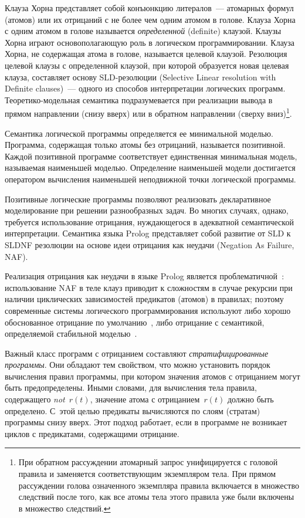 \begin{multicols}{2}
Клауза Хорна представляет собой конъюнкцию литералов~--- атомарных формул (атомов) 
или их отрицаний с не более чем одним атомом в голове. Клауза Хорна с одним атомом в 
голове называется \textit{определенной} (definite) клаузой. Клаузы Хорна играют 
основополагающую роль в логическом программировании. Клауза Хорна, не содержащая 
атома в голове, называется целевой клаузой. Резолюция целевой клаузы с определенной 
клаузой, при которой образуется новая целевая клауза, составляет основу SLD-резолюции 
(Selective Linear resolution with Definite clauses)~--- одного из способов интерпретации 
логических программ. Теоретико-модельная семантика подразумевается при реализации 
вывода в прямом направлении (снизу вверх) или в обратном направлении (сверху 
вниз)\footnote{При обратном рассуждении атомарный запрос унифицируется с головой 
правила и заменяется соответствующим экземпляром тела. При прямом рассуждении 
голова означенного экземпляра правила включается в множество следствий после того, как 
все атомы тела этого правила уже были включены в множество следствий.}.

Семантика логической программы определяется ее минимальной моделью. Программа, 
содержащая только атомы без отрицаний, называется\linebreak
позитивной. Каждой позитивной 
программе соответствует единственная минимальная модель, называемая наименьшей 
моделью. Определение\linebreak
наименьшей модели достигается оператором вычисления 
наименьшей неподвижной точки логической программы.

Позитивные логические программы позволяют реализовать декларативное моделирование 
при решении разнообразных задач. Во многих случаях, однако, требуется использование 
отрицания, нуж\-да\-юще\-го\-ся в адекватной семантической интерпретации. Семантика языка 
Prolog представляет собой развитие от SLD к SLDNF резолюции на основе идеи отрицания 
как неудачи (Negation As Failure, NAF).

Реализация отрицания как неудачи в языке Prolog является проблематичной~\cite{25kal}: 
использование NAF в теле клауз приводит к сложностям в случае рекурсии при наличии 
циклических зависимостей предикатов (атомов) в правилах; поэтому современные системы 
логического программирования используют либо хорошо обоснованное отрицание по 
умолчанию~\cite{26kal}, либо отрицание с семантикой, определяемой стабильной 
моделью~\cite{19kal, 27kal}.

Важный класс программ с отрицанием со\-став\-ля\-ют \textit{стратифицированные 
программы}. Они обладают тем свойством, что можно установить порядок вычисления 
правил программы, при котором значения атомов с отрицанием могут быть 
предопре\-де\-ле\-ны. Иными словами, для вычисления тела правила, содержащего 
\textit{not}~$r(t)$, значение атома с отрицанием~$r(t)$ должно быть определено. С~этой 
целью предикаты вычисляются по слоям (стратам) программы снизу вверх. Этот подход 
работает, если в программе не возникает циклов с предикатами, содержащими отрицание.


\end{multicols}
